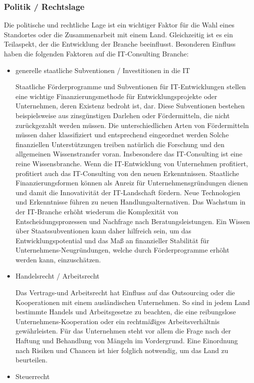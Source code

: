  \subsubsection{Politik / Rechtslage}
Die politische und rechtliche Lage ist ein wichtiger Faktor für die Wahl eines Standortes oder die Zusammenarbeit mit einem Land. Gleichzeitig ist es ein Teilaspekt, der die Entwicklung der Branche beeinflusst.
Besonderen Einfluss haben die folgenden Faktoren auf die IT-Consulting Branche:
\begin{itemize} 
\item {generelle staatliche Subventionen / Investitionen in die IT}

 Staatliche Förderprogramme und Subventionen für IT-Entwicklungen stellen eine wichtige Finanzierungsmethode für Entwicklungsprojekte oder Unternehmen, deren Existenz bedroht ist, dar. Diese Subventionen bestehen beispielsweise aus zinsgünstigen Darlehen oder Fördermitteln, die nicht zurückgezahlt werden müssen. Die unterschiedlichen Arten von Fördermitteln müssen daher klassifiziert und entsprechend eingeordnet werden
 Solche finanziellen Unterstützungen treiben natürlich die Forschung und den allgemeinen Wissenstransfer voran. Insbesondere das IT-Consulting ist eine reine Wissensbranche. Wenn die IT-Entwicklung von Unternehmen profitiert, profitiert auch das IT-Consulting von den neuen Erkenntnissen. 
 Staatliche Finanzierungsformen können als Anreiz für Unternehmensgründungen dienen und damit die Innovativität der IT-Landschaft fördern. Neue Technologien und Erkenntnisse führen zu neuen Handlungsalternativen. Das Wachstum in der IT-Branche erhöht wiederum die Komplexität von Entscheidungsprozessen und Nachfrage nach Beratungsleistungen.
Ein Wissen über Staatssubventionen kann daher hilfreich sein, um das Entwicklungspotential und das Maß an finanzieller Stabilität für Unternehmens-Neugründungen, welche durch Förderprogramme erhöht werden kann, einzuschätzen.
 \\
\item  {Handelsrecht / Arbeitsrecht}

 Das Vertrags-und Arbeitsrecht hat Einfluss auf das Outsourcing oder die Kooperationen mit einem ausländischen Unternehmen. 
 So sind in jedem Land bestimmte Handels und Arbeitsgesetze zu beachten, die eine reibungslose Unternehmens-Kooperation oder ein rechtmäßiges Arbeitsverhältnis gewährleisten. 
Für das Unternehmen steht vor allem die Frage nach der Haftung und Behandlung von Mängeln im Vordergrund. 
Eine Einordnung nach Risiken und Chancen ist hier folglich notwendig, um das Land zu beurteilen. 
 \\
\item {Steuerrecht}


\end{itemize}
